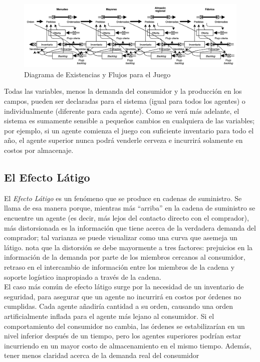 \begin{figure}[ht]
\caption{Diagrama de Existencias y Flujos para el Juego}
\label{stockflow}
\includegraphics[width=14cm]{tesis_tex/figs/beer_distribution_game_stock_flow.PNG}
\centering
\end{figure}

Todas las variables, menos la demanda del consumidor y la producci\'on en los campos, pueden ser declaradas para el sistema (igual para todos los agentes) o individualmente (diferente para cada agente). Como se ver\'a m\'as adelante, el sistema es sumamente sensible a peque\~nos cambios en cualquiera de las variables; por ejemplo, si un agente comienza el juego con suficiente inventario para todo el a\~no, el agente superior nunca podr\'a venderle cerveza e incurrir\'a solamente en costos por almacenaje.

\subsection{El Efecto Látigo}

El \textit{Efecto Látigo} es un fen\'omeno que se produce en cadenas de suministro. Se llama de esa manera porque, mientras m\'as ``arriba'' en la cadena de suministro se encuentre un agente (es decir, m\'as lejos del contacto directo con el comprador), m\'as distorsionada es la informaci\'on que tiene acerca de la verdadera demanda del comprador; tal varianza se puede visualizar como una curva que asemeja un l\'atigo. \citet{Chaharsooghi} nota que la distorsi\'on se debe mayormente a tres factores: prejuicios en la informaci\'on de la demanda por parte de los miembros cercanos al consumidor, retraso en el intercambio de informaci\'on entre los miembros de la cadena y soporte log\'istico inapropiado a trav\'es de la cadena. \\

El caso m\'as com\'un de efecto l\'atigo surge por la necesidad de un inventario de seguridad, para asegurar que un agente no incurrir\'a en costos por \'ordenes no cumplidas. Cada agente a\~nadir\'ia cantidad a su orden, causando una orden artificialmente inflada para el agente m\'as lejano al consumidor. Si el comportamiento del consumidor no cambia, las \'ordenes se estabilizar\'ian en un nivel inferior despu\'es de un tiempo, pero los agentes superiores podr\'ian estar incurriendo en un mayor costo de almacenamiento en el mismo tiempo. Adem\'as, tener menos claridad acerca de la demanda real del consumidor \\

